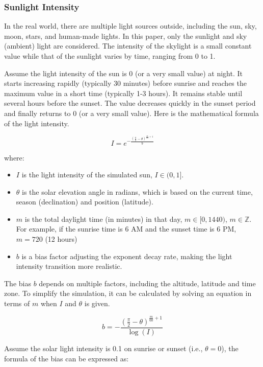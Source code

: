 \documentclass{article}
\begin{document}
\subsubsection {Sunlight Intensity}
In the real world, there are multiple light sources outside, including the sun, sky, moon, stars, 
and human-made lights. In this paper, only the sunlight and sky (ambient) light are considered. 
The intensity of the skylight is a small constant value while that of the sunlight varies by 
time, ranging from 0 to 1.

Assume the light intensity of the sun is 0 (or a very small value) at night. It starts increasing 
rapidly (typically 30 minutes) before sunrise and reaches the maximum value in a short time 
(typically 1-3 hours). It remains stable until several hours before the sunset. The value 
decreases quickly in the sunset period and finally returns to 0 (or a very small value). Here is 
the mathematical formula of the light intensity.

\[
  I = e^{-\frac{\left(\frac{\pi}{2} - \theta\right)^{\frac{m}{60} + 1}}{b}}
\]

where:
\begin{itemize}
  \item \( I \) is the light intensity of the simulated sun, \( I \in (0, 1] \).
  \item \( \theta \) is the solar elevation angle in radians, which is based on the current time, 
  season (declination) and position (latitude).
  \item \( m \) is the total daylight time (in minutes) in that day, \( m \in [0, 1440) \), \( m \in \mathbb{Z} \). 
  For example, if the sunrise time is 6 AM and the sunset time is 6 PM, \( m=720 \) (12 hours)
  \item \( b \) is a bias factor adjusting the exponent decay rate, making the light intensity
  transition more realistic.
\end{itemize}

The bias \( b \) depends on multiple factors, including the altitude, latitude and time zone. To
simplify the simulation, it can be calculated by solving an equation in terms of \( m \) when 
\( I \) and \( \theta\) is given.

\[
  b = -\frac{\left(\frac{\pi}{2} - \theta\right)^{\frac{m}{60} + 1}}{\log(I)}
\]

Assume the solar light intensity is 0.1 on sunrise or sunset (i.e., \( \theta=0\)), the formula 
of the bias can be expressed as:
\end{document}
